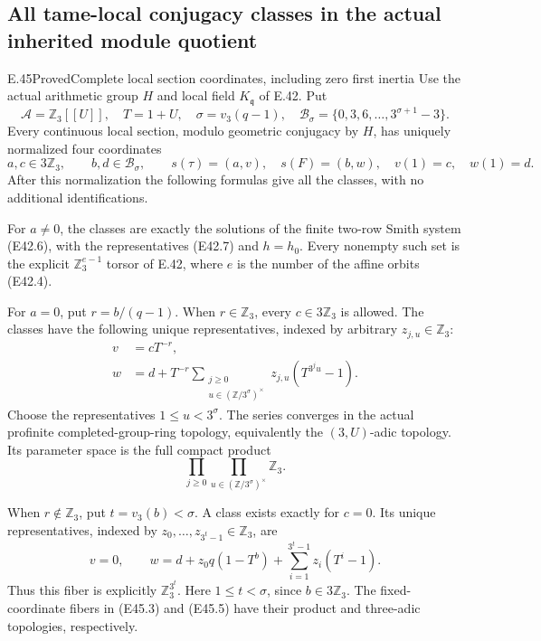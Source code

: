 \subsection{All tame-local conjugacy classes in the actual inherited module quotient}

\begin{statement}{E.45}{Proved}{Complete local section coordinates, including zero first inertia}
Use the actual arithmetic group $H$ and local field
$K_{\mathfrak q}$ of E.42. Put
\[
 \mathscr A=\mathbb Z_3[[U]],\quad T=1+U,\quad
 \sigma=v_3(q-1),\quad
 \mathcal B_\sigma=\{0,3,6,\ldots,3^{\sigma+1}-3\}.
 \tag{E45.1}
\]
Every continuous local section, modulo geometric
conjugacy by $H$, has uniquely normalized four
coordinates
\[
 a,c\in3\mathbb Z_3,\qquad b,d\in\mathcal B_\sigma,
 \qquad
 s(\tau)=(a,v),\quad s(F)=(b,w),\quad v(1)=c,\quad w(1)=d.
 \tag{E45.2}
\]
After this normalization the following formulas
give all the classes, with no additional
identifications.

For $a\ne0$, the classes are exactly the
solutions of the finite two-row Smith system
(E42.6), with the representatives (E42.7)
and $h=h_0$. Every nonempty such set is the
explicit $\mathbb Z_3^{e-1}$ torsor of E.42,
where $e$ is the number of the affine orbits
(E42.4).

For $a=0$, put $r=b/(q-1)$. When
$r\in\mathbb Z_3$, every $c\in3\mathbb Z_3$
is allowed. The classes have the following
unique representatives, indexed by arbitrary
$z_{j,u}\in\mathbb Z_3$:
\[
 \begin{split}
 v&=cT^{-r},\\
 w&=d+T^{-r}
        \sum_{\substack{j\ge0\\
                     u\in(\mathbb Z/3^\sigma)^\times}}
                 z_{j,u}(T^{3^j u}-1).
 \end{split}
 \tag{E45.3}
\]
Choose the representatives $1\le u<3^\sigma$.
The series converges in the actual profinite
completed-group-ring topology, equivalently
the $(3,U)$-adic topology. Its parameter
space is the full compact product
\[
          \prod_{j\ge0}\prod_{u\in(\mathbb Z/3^\sigma)^\times}
                         \mathbb Z_3.
 \tag{E45.4}
\]

When $r\notin\mathbb Z_3$, put
$t=v_3(b)<\sigma$. A class exists exactly
for $c=0$. Its unique representatives,
indexed by $z_0,\ldots,z_{3^t-1}\in\mathbb Z_3$,
are
\[
 v=0,\qquad
 w=d+z_0q(1-T^b)
          +\sum_{i=1}^{3^t-1}z_i(T^i-1).
 \tag{E45.5}
\]
Thus this fiber is explicitly $\mathbb Z_3^{3^t}$.
Here $1\le t<\sigma$, since $b\in3\mathbb Z_3$.
The fixed-coordinate fibers in (E45.3) and
(E45.5) have their product and three-adic
topologies, respectively.


\end{statement}
